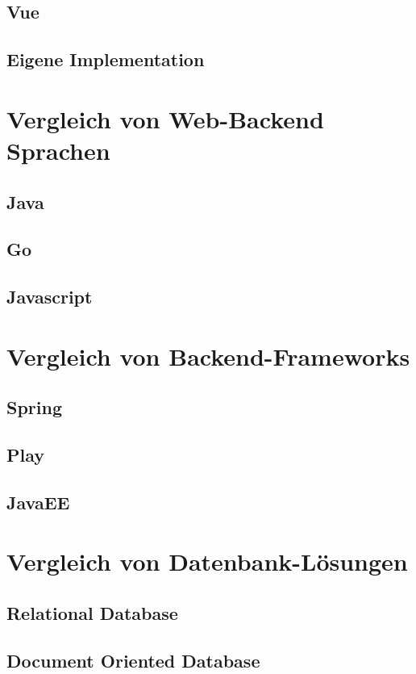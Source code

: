 \subsection{Vue}
\subsection{Eigene Implementation}
\section{Vergleich von Web-Backend Sprachen}
\subsection{Java}
\subsection{Go}
\subsection{Javascript}
\section{Vergleich von Backend-Frameworks}
\subsection{Spring}
\subsection{Play}
\subsection{JavaEE}
\section{Vergleich von Datenbank-Lösungen}
\subsection{Relational Database}
\subsection{Document Oriented Database}